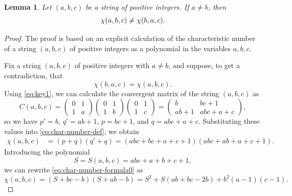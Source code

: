 \documentclass[10pt]{article}
\newtheorem{lemma}{Lemma}
\theoremstyle{definition}
\numberwithin{equation}{section}
\numberwithin{lemma}{section}
\newcommand{\mat}[1]{\begin{pmatrix} 0 & 1\\ 1 & #1\end{pmatrix}}
\begin{document}
\begin{lemma}
\label{lem:proof1.3-lem1}
Let $(a,b,c)$ be a string of positive integers.
If $a\not=b$, then 
\begin{equation}
\notag
\chi(a,b,c)\not=\chi(b,a,c).
\end{equation}
\end{lemma}
\begin{proof}
The proof is based on an explicit calculation of the characteristic
number of a string $(a,b,c)$ of positive integers as a polynomial 
in the variables $a,b,c$.

Fix a string $(a,b,c)$ of positive integers with $a\not=b$, and suppose,
to get a contradiction, that 
\begin{equation}
\label{eq:proof1.3-assumption-chi}
\chi(b,a,c)= \chi(a,b,c).
\end{equation}
Using \eqref{eq:key1}, we can calculate 
the convergent matrix of the string $(a,b,c)$ as 
\begin{equation*}
C(a,b,c)=\mat{a}\mat{b}\mat{c}
=\begin{pmatrix} b & bc+1\\ ab+1 & abc+a+c\end{pmatrix},
\end{equation*}
so we have $p'=b$, $q'=ab+1$, $p=bc+1$, and $q=abc+a+c$. Substituting these
values into \eqref{eq:char-number-def}, we obtain
\begin{align}
\label{eq:char-number-formula0}
\chi(a,b,c)&=(p+q)(q'+q)
=(abc+bc+a+c+1)(abc+ab+a+c+1).
\end{align}
Introducing the polynomial 
\begin{equation}
\label{eq:proof1.3-S-def}
S=S(a,b,c)=abc+a+b+c+1,
\end{equation}
we can rewrite \eqref{eq:char-number-formula0} as 
\begin{equation}
\label{eq:char-number-formula1}
\chi(a,b,c)=(S+bc-b)(S+ab-b)=S^2 +S(ab+bc-2b)+b^2(a-1)(c-1).
\end{equation}


\end{proof}
\end{document}
